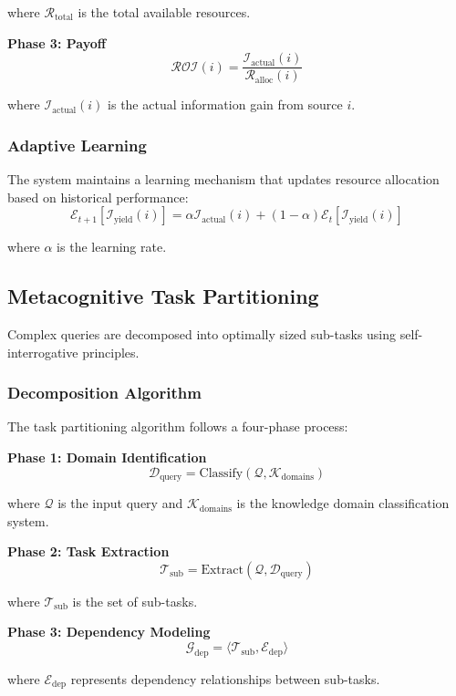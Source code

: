 \documentclass[12pt,a4paper]{article}
\begin{document}
where $\mathcal{R}_{\text{total}}$ is the total available resources.

\textbf{Phase 3: Payoff}
$$\mathcal{ROI}(i) = \frac{\mathcal{I}_{\text{actual}}(i)}{\mathcal{R}_{\text{alloc}}(i)}$$

where $\mathcal{I}_{\text{actual}}(i)$ is the actual information gain from source $i$.

\subsubsection{Adaptive Learning}

The system maintains a learning mechanism that updates resource allocation based on historical performance:
$$\mathcal{E}_{t+1}[\mathcal{I}_{\text{yield}}(i)] = \alpha \mathcal{I}_{\text{actual}}(i) + (1-\alpha) \mathcal{E}_t[\mathcal{I}_{\text{yield}}(i)]$$

where $\alpha$ is the learning rate.

\subsection{Metacognitive Task Partitioning}

Complex queries are decomposed into optimally sized sub-tasks using self-interrogative principles.

\subsubsection{Decomposition Algorithm}

The task partitioning algorithm follows a four-phase process:

\textbf{Phase 1: Domain Identification}
$$\mathcal{D}_{\text{query}} = \text{Classify}(\mathcal{Q}, \mathcal{K}_{\text{domains}})$$

where $\mathcal{Q}$ is the input query and $\mathcal{K}_{\text{domains}}$ is the knowledge domain classification system.

\textbf{Phase 2: Task Extraction}
$$\mathcal{T}_{\text{sub}} = \text{Extract}(\mathcal{Q}, \mathcal{D}_{\text{query}})$$

where $\mathcal{T}_{\text{sub}}$ is the set of sub-tasks.

\textbf{Phase 3: Dependency Modeling}
$$\mathcal{G}_{\text{dep}} = \langle \mathcal{T}_{\text{sub}}, \mathcal{E}_{\text{dep}} \rangle$$

where $\mathcal{E}_{\text{dep}}$ represents dependency relationships between sub-tasks.
\end{document}
